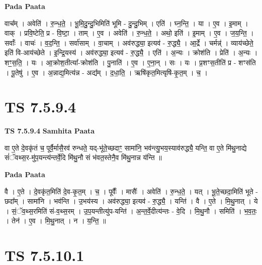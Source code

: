 \documentclass[17pt]{extarticle}
\begin{document}
\textbf{Pada Paata} \newline

वाच᳚म् । अवेति॑ । रु॒न्ध॒ते॒ । भू॒मि॒दु॒न्दु॒भिमिति॑ भूमि - दु॒न्दु॒भिम् । एति॑ । घ्न॒न्ति॒ । या । ए॒व । इ॒माम् । वाक् । प्रवि॒ष्टेति॒ प्र - वि॒ष्टा॒ । ताम् । ए॒व । अवेति॑ । रु॒न्ध॒ते॒ । अथो॒ इति॑ । इ॒माम् । ए॒व । ज॒य॒न्ति॒ । सर्वाः᳚ । वाचः॑ । व॒द॒न्ति॒ । सर्वा॑साम् । वा॒चाम् । अव॑रुद्ध्या॒ इत्यव॑ - रु॒द्ध्यै॒ । आ॒र्द्रे । चर्मन्न्॑ । व्याय॑च्छेते॒ इति॑ वि-आय॑च्छेते । इ॒न्द्रि॒यस्य॑ । अव॑रुद्ध्या॒ इत्यव॑ - रु॒द्ध्यै॒ । एति॑ । अ॒न्यः । क्रोश॑ति । प्रेति॑ । अ॒न्यः । शꣳ॒॒स॒ति॒ । यः । आ॒क्रोश॒तीत्या᳚-क्रोश॑ति । पु॒नाति॑ । ए॒व । ए॒ना॒न् । सः । यः । प्र॒शꣳस॒तीति॑ प्र - शꣳस॑ति । पू॒तेषु॑ । ए॒व । अ॒न्नाद्य॒मित्य॑न्न - अद्य᳚म् । द॒धा॒ति॒ । ऋषि॑कृत॒मित्यृषि॑-कृ॒त॒म् । च॒ ।  \newline





\section{ TS 7.5.9.4 }

\textbf{TS 7.5.9.4 } \newline
\textbf{Samhita Paata} \newline

वा ए॒ते दे॒वकृ॑तं च॒ पूर्वै॒र्मासै॒रव॑ रुन्धते॒ यद्-भू॑ते॒च्छदाꣳ॒॒ सामा॑नि॒ भव॑न्त्यु॒भय॒स्याव॑रुद्ध्यै॒ यन्ति॒ वा ए॒ते मि॑थु॒नाद्ये सं॑ॅवथ्स॒र-मु॑प॒यन्त्य॑न्तर्वे॒दि मि॑थु॒नौ सं भ॑वत॒स्तेनै॒व मि॑थु॒नान्न य॑न्ति ॥ \newline

\textbf{Pada Paata} \newline

वै । ए॒ते । दे॒वकृ॑त॒मिति॑ दे॒व-कृ॒त॒म् । च॒ । पूर्वैः᳚ । मासैः᳚ । अवेति॑ । रु॒न्ध॒ते॒ । यत् । भू॒ते॒च्छदा॒मिति॑ भूते - छदा᳚म् । सामा॑नि । भव॑न्ति । उ॒भय॑स्य । अव॑रुद्ध्या॒ इत्यव॑ - रु॒द्ध्यै॒ । यन्ति॑ । वै । ए॒ते । मि॒थु॒नात् । ये । सं॒ॅव॒थ्स॒रमिति॑ सं-व॒थ्स॒रम् । उ॒प॒यन्तीत्यु॑प-यन्ति॑ । अ॒न्त॒र्वे॒दीत्य॑न्तः - वे॒दि । मि॒थु॒नौ । समिति॑ । भ॒व॒तः॒ । तेन॑ । ए॒व । मि॒थु॒नात् । न । य॒न्ति॒ ॥  \newline





\section{ TS 7.5.10.1 }
\end{document}
